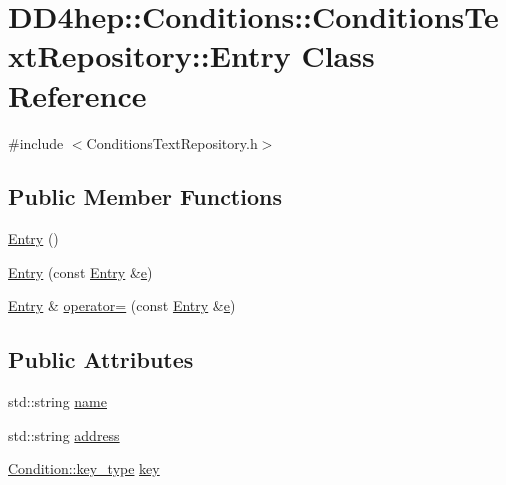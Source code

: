 \hypertarget{class_d_d4hep_1_1_conditions_1_1_conditions_text_repository_1_1_entry}{}\section{D\+D4hep\+:\+:Conditions\+:\+:Conditions\+Text\+Repository\+:\+:Entry Class Reference}
\label{class_d_d4hep_1_1_conditions_1_1_conditions_text_repository_1_1_entry}


{\ttfamily \#include $<$Conditions\+Text\+Repository.\+h$>$}

\subsection*{Public Member Functions}
\begin{DoxyCompactItemize}
\item 
\hyperlink{class_d_d4hep_1_1_conditions_1_1_conditions_text_repository_1_1_entry_a9146bcb872abe9741774c1c6b967fac7}{Entry} ()
\item 
\hyperlink{class_d_d4hep_1_1_conditions_1_1_conditions_text_repository_1_1_entry_afe8a21e97ecbe0686508a5bf5b847f43}{Entry} (const \hyperlink{class_d_d4hep_1_1_conditions_1_1_conditions_text_repository_1_1_entry}{Entry} \&\hyperlink{_volumes_8cpp_a8a9a1f93e9b09afccaec215310e64142}{e})
\item 
\hyperlink{class_d_d4hep_1_1_conditions_1_1_conditions_text_repository_1_1_entry}{Entry} \& \hyperlink{class_d_d4hep_1_1_conditions_1_1_conditions_text_repository_1_1_entry_a16b49e4960ded6fa394dc3173f37dd4e}{operator=} (const \hyperlink{class_d_d4hep_1_1_conditions_1_1_conditions_text_repository_1_1_entry}{Entry} \&\hyperlink{_volumes_8cpp_a8a9a1f93e9b09afccaec215310e64142}{e})
\end{DoxyCompactItemize}
\subsection*{Public Attributes}
\begin{DoxyCompactItemize}
\item 
std\+::string \hyperlink{class_d_d4hep_1_1_conditions_1_1_conditions_text_repository_1_1_entry_aacad5506cc8e8f5d9369ff635371a1f6}{name}
\item 
std\+::string \hyperlink{class_d_d4hep_1_1_conditions_1_1_conditions_text_repository_1_1_entry_a29d5e08d84bea3989d09c5799f3f1393}{address}
\item 
\hyperlink{class_d_d4hep_1_1_conditions_1_1_condition_a7528efa762e8cc072ef80ea67c3531f9}{Condition\+::key\+\_\+type} \hyperlink{class_d_d4hep_1_1_conditions_1_1_conditions_text_repository_1_1_entry_a46681700774cfba80ad2c32ea18dd8dd}{key}
\end{DoxyCompactItemize}


